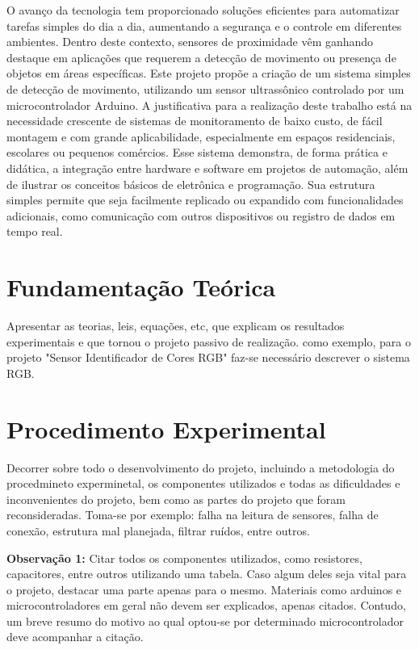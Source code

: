 \documentclass[a4paper,12pt]{article}
\begin{document}
O avanço da tecnologia tem proporcionado soluções eficientes para automatizar tarefas simples do dia a dia, aumentando a segurança e o controle em diferentes ambientes. Dentro deste contexto, sensores de proximidade vêm ganhando destaque em aplicações que requerem a detecção de movimento ou presença de objetos em áreas específicas. Este projeto propõe a criação de um sistema simples de detecção de movimento, utilizando um sensor ultrassônico controlado por um microcontrolador Arduino.
 A justificativa para a realização deste trabalho está na necessidade crescente de sistemas de monitoramento de baixo custo, de fácil montagem e com grande aplicabilidade, especialmente em espaços residenciais, escolares ou pequenos comércios.
 Esse sistema demonstra, de forma prática e didática, a integração entre hardware e software em projetos de automação, além de ilustrar os conceitos básicos de eletrônica e programação. Sua estrutura simples permite que seja facilmente replicado ou expandido com funcionalidades adicionais, como comunicação com outros dispositivos ou registro de dados em tempo real.

\newpage
\section{Fundamentação Teórica}
\label{sec:teoria}
Apresentar as teorias, leis, equações, etc, que explicam os  resultados  experimentais e que tornou o projeto passivo de realização. como exemplo, para o projeto "Sensor Identificador de Cores RGB" faz-se necessário descrever o sistema RGB. 

\newpage
\section{Procedimento Experimental}
\label{sec:procedimento_experimental}
Decorrer sobre todo o desenvolvimento do projeto, incluindo a metodologia do procedmineto experminetal, os componentes utilizados e todas as dificuldades e inconvenientes do projeto, bem como as partes do projeto que foram reconsideradas. Toma-se por exemplo: falha na leitura de sensores, falha de conexão, estrutura mal planejada, filtrar ruídos, entre outros.

\textbf{Observação 1: } Citar todos os componentes utilizados, como resistores, capacitores, entre outros utilizando uma tabela. Caso algum deles seja vital para o projeto, destacar uma parte apenas para o mesmo. Materiais como arduinos e microcontroladores em geral não devem ser explicados, apenas citados. Contudo, um breve resumo do motivo ao qual optou-se por determinado microcontrolador deve acompanhar a citação.
\end{document}
